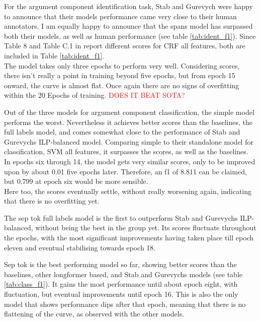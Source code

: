 \documentclass[12]{article}
\theoremstyle{mytheoremstyle}
\theoremstyle{mytheoremstyle}
\theoremstyle{myproblemstyle}
\begin{document}
  For the argument component identification task, Stab and Gurevych were happy to announce that their models performance came very close to their human annotators. 
  I am equally happy to announce that the spans model has surpassed both their models, as well as human performance (see table \ref{tab:ident_f1}). 
  Since Table 8 and Table C.1 in \cite{stab-gurevych-2017-parsing} report different scores for CRF all features, both are included in Table \ref{tab:ident_f1}.\\
  The model takes only three epochs to perform very well. 
  Considering scores, there isn't really a point in training beyond five epochs, but from epoch 15 onward, the curve is almost flat. 
  Once again there are no signs of overfitting within the 20 Epochs of training. 
  \textcolor{red}{DOES IT BEAT SOTA?}

  Out of the three models for argument component classification, the simple model performs the worst. 
  Nevertheless it achieves better scores than the baselines, the full labels model, and comes somewhat close to the performance of Stab and Gurevychs ILP-balanced model. 
  Comparing simple to their standalone model for classification, SVM all features, it surpasses the scores, as well as the baselines.\\
  In epochs six through 14, the model gets very similar scores, only to be improved upon by about 0.01 five epochs later. 
  Therefore, an f1 of 8.811 can be claimed, but 0.799 at epoch six would be more sensible.\\
  Here too, the scores eventually settle, without really worsening again, indicating that there is no overfitting yet.

  The sep tok full labels model is the first to outperform Stab and Gurevychs ILP-balanced, without being the best in the group yet. 
  Its scores fluctuate throughout the epochs, with the most significant improvements having taken place till epoch eleven and eventual stabilising towards epoch 18.

  Sep tok is the best performing model so far, showing better scores than the baselines, other longformer based, and Stab and Gurevychs models (see table \ref{tab:class_f1}). 
  It gains the most performance until about epoch eight, with fluctuation, but eventual improvements until epoch 16. 
  This is also the only model that shows performance dips after that epoch, meaning that there is no flattening of the curve, as observed with the other models.
\end{document}
